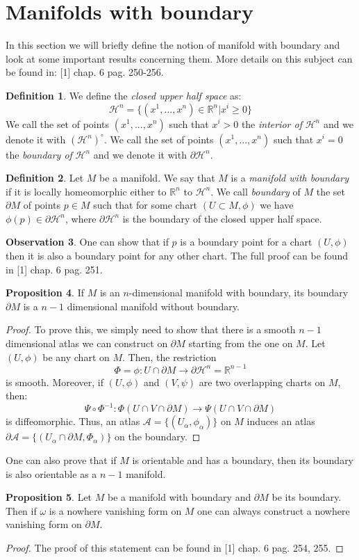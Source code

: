 \documentclass[12pt,a4paper]{report}
\theoremstyle{definition}
\newtheorem{Def}{Definition}[chapter]
\theoremstyle{Theorem}
\newtheorem{Prop}[Def]{Proposition}
\theoremstyle{definition}
\theoremstyle{definition}
\newtheorem{Obs}[Def]{Observation}
\begin{document}
	\section{{Manifolds with boundary}}
	In this section we will briefly define the notion of manifold with boundary and look at some important results concerning them. More details on this subject can be found in: [1] chap. 6 pag. 250-256.
	\begin{Def}
		We define the \textit{closed upper half space} as:
		$$\mathcal{H}^n=\{(x^1,...,x^n)\in\mathbb{R}^n|x^i\geq 0\}$$
		We call the set of points $(x^1,...,x^n)$ such that $x^i>0$ the \textit{interior of} $\mathcal{H}^n$ and we denote it with $(\mathcal{H}^n)^\circ$. We call the set of points $(x^1,...,x^n)$ such that $x^i=0$ the \textit{boundary of} $\mathcal{H}^n$ and we denote it with $\partial\mathcal{H}^n$.
	\end{Def}
	\begin{Def}
		Let $M$ be a manifold. We say that $M$ is a \textit{manifold with boundary} if it is locally homeomorphic either to $\mathbb{R}^n$ to $\mathcal{H}^n$. We call \textit{boundary} of $M$ the set $\partial M$ of points $p\in M$ such that for some chart $(U\subset M, \phi)$ we have $\phi(p)\in\partial\mathcal{H}^n$, where $\partial\mathcal{H}^n$ is the boundary of the closed upper half space.
	\end{Def}
	\begin{Obs}
		One can show that if $p$ is a boundary point for a chart $(U,\phi)$ then it is also a boundary point for any other chart. The full proof can be found in [1] chap. 6 pag. 251.
	\end{Obs}
	\begin{Prop}
		If $M$ is an $n$-dimensional manifold with boundary, its boundary $\partial M$ is a $n-1$ dimensional manifold without boundary.
	\end{Prop}
	\begin{proof}
		To prove this, we simply need to show that there is a smooth $n-1$ dimensional atlas we can construct on $\partial M$ starting from the one on $M$. Let $(U,\phi)$ be any chart on $M$. Then, the restriction
		$$\Phi=\phi:U\cap \partial M\rightarrow \partial \mathcal{H}^n=\mathbb{R}^{n-1}$$
		is smooth. Moreover, if $(U,\phi)$ and $(V,\psi)$ are two overlapping charts on $M$, then:
		$$\Psi\circ \Phi^{-1}:\Phi(U\cap V\cap \partial M)\rightarrow \Psi(U\cap V\cap \partial M)$$ 
		is diffeomorphic. Thus, an atlas $\mathcal{A}=\{(U_\alpha,\phi_\alpha)\}$ on $M$ induces an atlas $\mathcal{\partial A}=\{(U_\alpha\cap\partial M,\Phi_\alpha)\}$ on the boundary.
	\end{proof}
	One can also prove that if $M$ is orientable and has a boundary, then its boundary is also orientable as a $n-1$ manifold.
	\begin{Prop}
		Let $M$ be a manifold with boundary and $\partial M$ be its boundary. Then if $\omega$ is a nowhere vanishing form on $M$ one can always construct a nowhere vanishing form on $\partial M$.
	\end{Prop}
	\begin{proof}
		The proof of this statement can be found in [1] chap. 6 pag. 254, 255.
	\end{proof}
\end{document}
